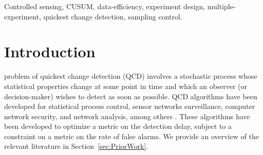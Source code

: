 \documentclass[journal, onecolumn]{IEEEtran}
\begin{document}
\begin{IEEEkeywords}
Controlled sensing, CUSUM, data-efficiency, experiment design, multiple-experiment, quickest change detection, sampling control.
\end{IEEEkeywords}






%
\IEEEpeerreviewmaketitle






\section{Introduction}
% 
% 
% 
% 
 problem of quickest change detection (QCD) involves a stochastic process whose statistical properties change at some point in time and which an observer (or decision-maker) wishes to detect as soon as possible. QCD algorithms have been developed for statistical process control, sensor networks surveillance, computer network security, and network analysis, among others  \cite{veeravalli2013, poor2009, tartakovsky2014, tartakovsky2019}. These algorithms have been developed to optimize a metric on the detection delay, subject to a constraint on a metric on the rate of false alarms.  We provide an overview of the relevant literature in Section~\ref{sec:PriorWork}. 

\end{document}
